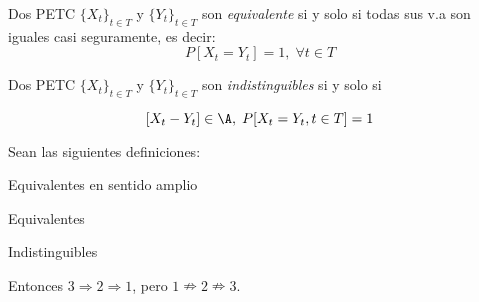 \begin{ndef}
  Dos PETC $\{X_t\}_{t \in T}$ y $\{Y_t\}_{t \in T}$ son \emph{equivalente} si y solo si todas sus v.a son iguales casi seguramente, es decir: $$P[X_t = Y_t] = 1, \; \forall t \in T$$
\end{ndef}


\begin{ndef}
  Dos PETC $\{X_t\}_{t \in T}$ y $\{Y_t\}_{t \in T}$ son \emph{indistinguibles} si y solo si

  $$[X_t - Y_t] \in \A, \; P[X_t = Y_t, t \in T] = 1$$
\end{ndef}

\begin{nprop}
  Sean las siguientes definiciones:
  \begin{nlist}
    \item Equivalentes en sentido amplio
    \item Equivalentes
    \item Indistinguibles
  \end{nlist}

  Entonces $3 \Rightarrow 2 \Rightarrow 1$, pero $1 \nRightarrow 2 \nRightarrow 3$.
\end{nprop}

